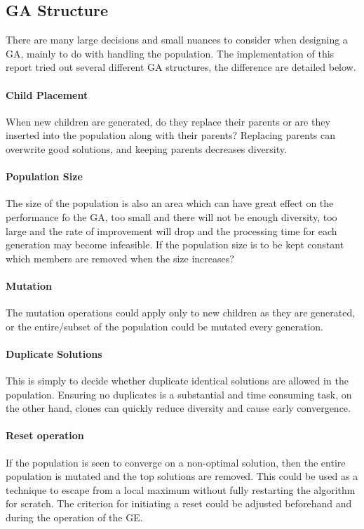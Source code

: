 \documentclass[14pt]{acmsiggraph}
\begin{document}
	\subsection{GA Structure}
	There are many large decisions and small nuances to consider when designing a GA, mainly to do with handling the population. The implementation of this report tried out several different GA structures, the difference are detailed below. 
	
	\paragraph{Child Placement}
	When new children are generated, do they replace their parents or are they inserted into the population along with their parents? Replacing parents can overwrite good solutions, and keeping parents decreases diversity.
	
	\paragraph{Population Size}
	The size of the population is also an area which can have great effect on the performance fo the GA, too small and there will not be enough diversity, too large and the rate of improvement will drop and the processing time for each generation may become infeasible. If the population size is to be kept constant which members are removed when the size increases?
	
	\paragraph{Mutation}
	The  mutation operations could apply only to new children as they are generated, or the entire/subset of the population could be mutated every generation.
	
	\paragraph{Duplicate Solutions}
	This is simply to decide whether duplicate identical solutions are allowed in the population. Ensuring no duplicates is a substantial and time consuming task, on the other hand, clones can quickly reduce diversity and cause early convergence.
	
	\paragraph{Reset operation}
	If the population is seen to converge on a non-optimal solution, then the entire population is mutated and the top solutions are removed. This could be  used as a technique to escape from a local maximum without fully restarting the algorithm for scratch. The criterion for initiating a reset could be adjusted beforehand and during the operation of the GE.
	
\end{document}
